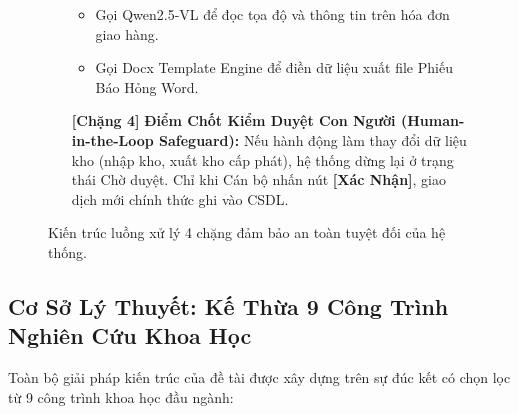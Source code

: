 \documentclass[11pt,a4paper]{article}
\begin{document}
\begin{figure}[H]
\begin{tcolorbox}[colback=white,colframe=NavyHust,sharp corners,boxrule=1pt]
\begin{enumerate}[leftmargin=2.0em, itemsep=6pt]
\begin{itemize}[leftmargin=1.2em, itemsep=2pt]
        \item Gọi Qwen2.5-VL để đọc tọa độ và thông tin trên hóa đơn giao hàng.
        \item Gọi Docx Template Engine để điền dữ liệu xuất file Phiếu Báo Hỏng Word.
    \end{itemize}
    \item[\textbf{[Chặng 4]}] \textbf{Điểm Chốt Kiểm Duyệt Con Người (Human-in-the-Loop Safeguard):} Nếu hành động làm thay đổi dữ liệu kho (nhập kho, xuất kho cấp phát), hệ thống dừng lại ở trạng thái Chờ duyệt. Chỉ khi Cán bộ nhấn nút \textbf{[Xác Nhận]}, giao dịch mới chính thức ghi vào CSDL.
\end{enumerate}
\end{tcolorbox}
\caption{Kiến trúc luồng xử lý 4 chặng đảm bảo an toàn tuyệt đối của hệ thống.}
\end{figure}

\subsection{Cơ Sở Lý Thuyết: Kế Thừa 9 Công Trình Nghiên Cứu Khoa Học}
Toàn bộ giải pháp kiến trúc của đề tài được xây dựng trên sự đúc kết có chọn lọc từ 9 công trình khoa học đầu ngành:
\end{document}
